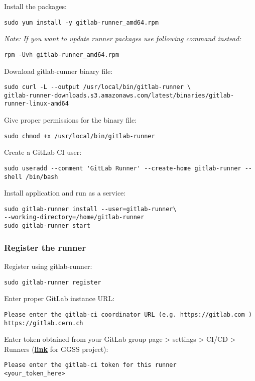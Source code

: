 \noindent
Install the packages:
\begin{lstlisting}
sudo yum install -y gitlab-runner_amd64.rpm
\end{lstlisting}

\noindent
\textit{Note: If you want to update runner packages use following command instead:}
\begin{lstlisting}
rpm -Uvh gitlab-runner_amd64.rpm
\end{lstlisting}

\noindent
Download gitlab-runner binary file:
\begin{lstlisting}
sudo curl -L --output /usr/local/bin/gitlab-runner \
gitlab-runner-downloads.s3.amazonaws.com/latest/binaries/gitlab-runner-linux-amd64
\end{lstlisting}

\noindent
Give proper permissions for the binary file:
\begin{lstlisting}
sudo chmod +x /usr/local/bin/gitlab-runner
\end{lstlisting}

\noindent
Create a GitLab CI user:
\begin{lstlisting}
sudo useradd --comment 'GitLab Runner' --create-home gitlab-runner --shell /bin/bash
\end{lstlisting}

\noindent
Install application and run as a service:
\begin{lstlisting}
sudo gitlab-runner install --user=gitlab-runner\
--working-directory=/home/gitlab-runner
sudo gitlab-runner start
\end{lstlisting}

\subsubsection*{Register the runner}

\noindent
Register using gitlab-runner:
\begin{lstlisting}
sudo gitlab-runner register
\end{lstlisting}

\noindent
Enter proper GitLab instance URL:
\begin{lstlisting}
Please enter the gitlab-ci coordinator URL (e.g. https://gitlab.com )
https://gitlab.cern.ch
\end{lstlisting}

\noindent
Enter token obtained from your GitLab group page > settings > CI/CD > Runners (\href{https://gitlab.cern.ch/groups/atlas-trt-dcs-ggss/-/settings/ci_cd}{\textbf{link}} for GGSS project):
\begin{lstlisting}
Please enter the gitlab-ci token for this runner
<your_token_here>
\end{lstlisting}

